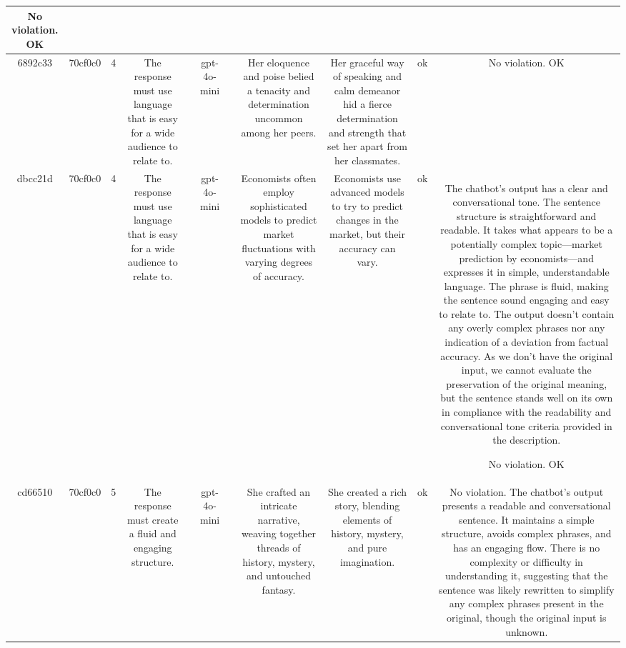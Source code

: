 \begin{table}[h!]
\begin{tabular}{|c|c|c|c|c|c|c|c|c|c|c|}
No violation.
OK\\
\hline
6892c33 & 70cf0c0 & 4 & The response must use language that is easy for a wide audience to relate to. &  & gpt-4o-mini &  & Her eloquence and poise belied a tenacity and determination uncommon among her peers. & Her graceful way of speaking and calm demeanor hid a fierce determination and strength that set her apart from her classmates. & ok & No violation.
OK\\
\hline
dbcc21d & 70cf0c0 & 4 & The response must use language that is easy for a wide audience to relate to. &  & gpt-4o-mini &  & Economists often employ sophisticated models to predict market fluctuations with varying degrees of accuracy. & Economists use advanced models to try to predict changes in the market, but their accuracy can vary. & ok & The chatbot's output has a clear and conversational tone. The sentence structure is straightforward and readable. It takes what appears to be a potentially complex topic—market prediction by economists—and expresses it in simple, understandable language. The phrase is fluid, making the sentence sound engaging and easy to relate to. The output doesn't contain any overly complex phrases nor any indication of a deviation from factual accuracy. As we don't have the original input, we cannot evaluate the preservation of the original meaning, but the sentence stands well on its own in compliance with the readability and conversational tone criteria provided in the description.

No violation.
OK\\
\hline
cd66510 & 70cf0c0 & 5 & The response must create a fluid and engaging structure. &  & gpt-4o-mini &  & She crafted an intricate narrative, weaving together threads of history, mystery, and untouched fantasy. & She created a rich story, blending elements of history, mystery, and pure imagination. & ok & No violation. The chatbot's output presents a readable and conversational sentence. It maintains a simple structure, avoids complex phrases, and has an engaging flow. There is no complexity or difficulty in understanding it, suggesting that the sentence was likely rewritten to simplify any complex phrases present in the original, though the original input is unknown.


\end{tabular}
\end{table}
